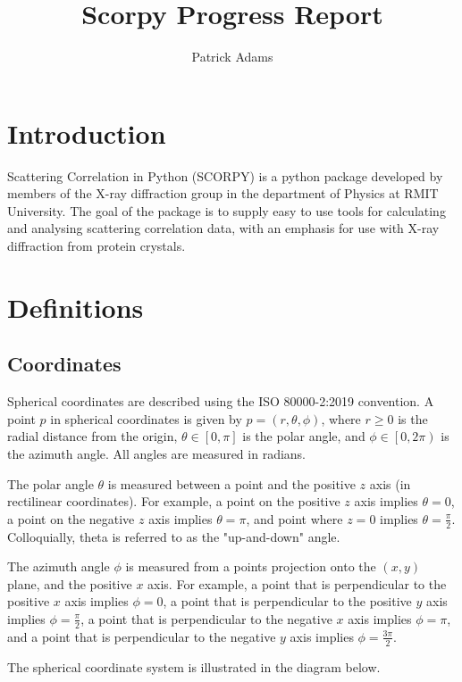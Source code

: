 \documentclass[a4, 12pt]{article}
\title{Scorpy Progress Report}
\author{Patrick Adams}
\date{}
\begin{document}
\maketitle


\section{Introduction}


Scattering Correlation in Python (SCORPY) is a python package developed by members of the X-ray diffraction group in the department of Physics at RMIT University. The goal of the package is to supply easy to use tools for calculating and analysing scattering correlation data, with an emphasis for use with X-ray diffraction from protein crystals.




\section{Definitions}

\subsection{Coordinates}

Spherical coordinates are described using the ISO 80000-2:2019 convention. A point $p$ in spherical coordinates is given by $p=(r, \theta, \phi)$, where $r \geq 0$ is the radial distance from the origin, $\theta \in \left[0, \pi\right]$ is the polar angle, and $\phi \in \left[0, 2\pi\right)$ is the azimuth angle. All angles are measured in radians. 

The polar angle $\theta$ is measured between a point and the positive $z$ axis (in rectilinear coordinates). For example, a point on the positive $z$ axis implies $\theta=0$, a point on the negative $z$ axis implies $\theta=\pi$, and point where $z=0$ implies $\theta=\frac{\pi}{2}$. Colloquially, theta is referred to as the "up-and-down" angle.

The azimuth angle $\phi$ is measured from a points projection onto the $(x,y)$ plane, and the positive $x$ axis. For example, a point that is perpendicular to the positive $x$ axis implies $\phi=0$, a point that is perpendicular to the positive $y$ axis implies $\phi=\frac{\pi}{2}$, a point that is perpendicular to the negative $x$ axis implies $\phi=\pi$, and a point that is perpendicular to the negative $y$ axis implies $\phi=\frac{3\pi}{2}$.

The spherical coordinate system is illustrated in the diagram below.
\end{document}
